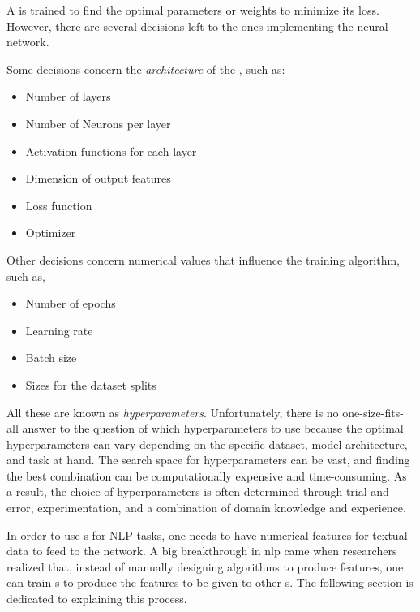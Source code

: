 \label{02_nn_hyperparameters}

A \neuralNetwork{} is trained to find the optimal parameters or weights to minimize its loss. However, there are several decisions left to the ones implementing the neural network.

Some decisions concern the \emph{architecture} of the \neuralNetwork{}, such as:

\begin{itemize}
    \item Number of layers
    \item Number of Neurons per layer
    \item Activation functions for each layer
    \item Dimension of output features
    \item Loss function
    \item Optimizer
\end{itemize}

Other decisions concern numerical values that influence the training algorithm, such as, 

\begin{itemize}
    \item Number of epochs
    \item Learning rate
    \item Batch size
    \item Sizes for the dataset splits
\end{itemize}

All these are known as \emph{hyperparameters}. Unfortunately, there is no one-size-fits-all answer to the question of which hyperparameters to use because the optimal hyperparameters can vary depending on the specific dataset, model architecture, and task at hand. The search space for hyperparameters can be vast, and finding the best combination can be computationally expensive and time-consuming. As a result, the choice of hyperparameters is often determined through trial and error, experimentation, and a combination of domain knowledge and experience.




\label{02_nn_nlp_tasks}

In order to use \neuralNetwork{}s for NLP tasks, one needs to have numerical features for textual data to feed to the network.
A big breakthrough in \gls{nlp} came when researchers realized that, instead of manually designing algorithms to produce features, one can train \neuralNetwork{}s to produce the features to be given to other \neuralNetwork{}s. The following section is dedicated to explaining this process.



